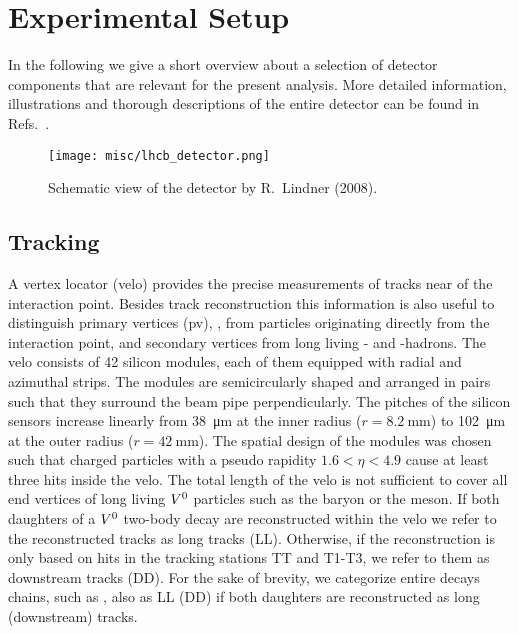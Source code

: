 \section{Experimental Setup}
In the following we give a short overview about a selection of detector components that are relevant for the present analysis.
More detailed information, illustrations and thorough descriptions of the entire detector can be found in Refs.~\cite{lhcbdet,lhcbPerformance_run1}.
\begin{figure}[htbp]
    \centering
    \texttt{[image: misc/lhcb\_detector.png]}
    \caption{Schematic view of the \lhcb detector by R.~Lindner (2008).}
\end{figure}

\subsection{Tracking}
\label{sec:detector_tracking}
A vertex locator (\gls{velo}) provides the precise measurements of tracks near of the \proton\proton interaction point.
Besides track reconstruction this information is also useful to distinguish primary vertices (\gls{pv}), \eg{}, from particles originating directly from the interaction point, and secondary vertices from long living \bquark- and \cquark-hadrons.
The \gls{velo} consists of \num{42} silicon modules, each of them equipped with radial and azimuthal strips.
The modules are semicircularly shaped and arranged in pairs such that they surround the beam pipe perpendicularly.
The pitches of the silicon sensors increase linearly from \SI{38}{\micro\meter} at the inner radius ($r=\SI{8.2}{\milli\meter}$) to \SI{102}{\micro\meter} at the outer radius ($r=\SI{42}{\milli\meter}$).
The spatial design of the modules was chosen such that charged particles with a pseudo rapidity $1.6 < \eta < 4.9$ cause at least three hits inside the \gls{velo}.
The total length of the \gls{velo} is not sufficient to cover all end vertices of long living $V^0$ particles such as the \Lz baryon or the \KS meson.
If both daughters of a $V^0$ two-body decay are reconstructed within the \gls{velo} we refer to the reconstructed tracks as long tracks (\gls{LL}).
Otherwise, if the reconstruction is only based on hits in the tracking stations TT and T1-T3, we refer to them as downstream tracks (\gls{DD}).
For the sake of brevity, we categorize entire decays chains, such as \decay{\Lb}{\Dz\Lz}, also as \gls{LL} (\gls{DD}) if both \Lz daughters are reconstructed as long (downstream) tracks.

